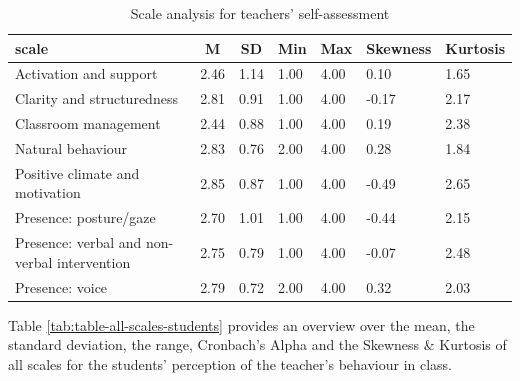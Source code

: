 \documentclass[
  english,
  man,floatsintext]{apa6}
\begin{document}
\begin{table}[h]

\begin{center}
\begin{threeparttable}

\caption{\label{tab:table-all-scales-self-assessment}Scale analysis for teachers' self-assessment}

\small{

\begin{tabular}{lllllll}
\toprule
scale & \multicolumn{1}{c}{M} & \multicolumn{1}{c}{SD} & \multicolumn{1}{c}{Min} & \multicolumn{1}{c}{Max} & \multicolumn{1}{c}{Skewness} & \multicolumn{1}{c}{Kurtosis}\\
\midrule
Activation and support & 2.46 & 1.14 & 1.00 & 4.00 & 0.10 & 1.65\\
Clarity and structuredness & 2.81 & 0.91 & 1.00 & 4.00 & -0.17 & 2.17\\
Classroom management & 2.44 & 0.88 & 1.00 & 4.00 & 0.19 & 2.38\\
Natural behaviour & 2.83 & 0.76 & 2.00 & 4.00 & 0.28 & 1.84\\
Positive climate and motivation & 2.85 & 0.87 & 1.00 & 4.00 & -0.49 & 2.65\\
Presence: posture/gaze & 2.70 & 1.01 & 1.00 & 4.00 & -0.44 & 2.15\\
Presence: verbal and non-verbal intervention & 2.75 & 0.79 & 1.00 & 4.00 & -0.07 & 2.48\\
Presence: voice & 2.79 & 0.72 & 2.00 & 4.00 & 0.32 & 2.03\\
\bottomrule
\end{tabular}

}

\end{threeparttable}
\end{center}

\end{table}

Table \ref{tab:table-all-scales-students} provides an overview over the mean, the standard deviation, the range, Cronbach's Alpha and the Skewness \& Kurtosis of all scales for the students' perception of the teacher's behaviour in class.
\end{document}

